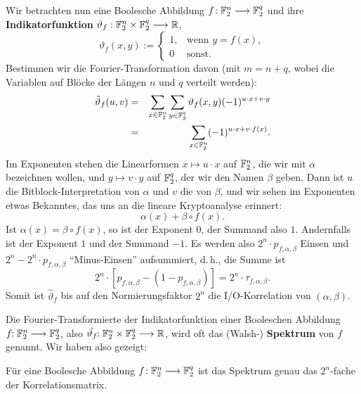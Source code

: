 \begin{refsegment}
Wir betrachten nun eine Boolesche
Abbildung
$f\!: \mathbb{F}_2^n \longrightarrow \mathbb{F}_2^q$ und ihre
\textbf{Indikatorfunktion}
$\vartheta_f: \mathbb{F}_2^n \times \mathbb{F}_2^q \longrightarrow \mathbb{R}$,
\[
  \vartheta_f(x,y) := \left\{ \begin{array}{ll}
                     1, & \textrm{wenn } y = f(x), \\
                     0  & \textrm{sonst.}
                   \end{array} \right.
\]
Bestimmen wir die Fourier-Transformation
davon (mit $m = n+q$, wobei die
Variablen auf Blöcke der Längen $n$ und $q$ verteilt werden):
\begin{eqnarray*}
  \hat{\vartheta}_f(u,v) & = & \sum_{x \in \mathbb{F}_2^n} \sum_{y \in \mathbb{F}_2^q}
                            \vartheta_f(x,y) (-1)^{u\cdot x + v\cdot y} \\
    & = & \sum_{x \in \mathbb{F}_2^n} (-1)^{u\cdot x + v\cdot f(x)}.
\end{eqnarray*}
Im Exponenten stehen die Linearformen $x \mapsto u \cdot x$ auf $\mathbb{F}_2^n$,
die wir mit $\alpha$ bezeichnen wollen, und $y \mapsto v \cdot y$ auf $\mathbb{F}_2^q$,
der wir den Namen $\beta$ geben. Dann ist $u$ die Bitblock-Interpretation
von $\alpha$ und $v$ die von $\beta$, und wir sehen im Exponenten etwas Bekanntes,
das uns an die lineare
Kryptoanalyse erinnert:
\[
     \alpha(x) + \beta \circ f(x).
\]
Ist $\alpha(x) = \beta \circ f(x)$, so ist der Exponent $0$, der
Summand also $1$. Andernfalls ist der Exponent $1$ und der Summand $-1$.
Es werden also $2^n \cdot p_{f,\alpha,\beta}$ Einsen und
$2^n - 2^n \cdot p_{f,\alpha,\beta}$ "`Minus-Einsen"' aufsummiert, d.\,h.,
die Summe ist
\[
     2^n \cdot [p_{f,\alpha,\beta} - (1 - p_{f,\alpha,\beta})]
     = 2^n \cdot \tau_{f,\alpha,\beta}.
\]
Somit ist $\hat{\vartheta}_f$ bis auf den Normierungsfaktor $2^n$ die
I/O-Korrelation von $(\alpha, \beta)$.

Die Fourier-Transformierte der Indikatorfunktion
einer Booleschen Abbildung
$f\!\!: \mathbb{F}_2^n \longrightarrow \mathbb{F}_2^q$, also
$\hat{\vartheta_f}\!\!: \mathbb{F}_2^n \times \mathbb{F}_2^q \longrightarrow \mathbb{R}$,
wird oft das (Walsh-) \textbf{Spektrum}
von $f$ genannt. Wir haben also gezeigt:

\begin{satz}\label{hwtchar}
  Für eine Boolesche Abbildung $f\!:\mathbb{F}_2^n \longrightarrow \mathbb{F}_2^q$
  ist das Spektrum genau das $2^n$-fache der
  Korrelationsmatrix.
\end{satz}


\end{refsegment}
